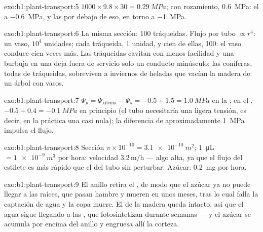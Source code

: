 \begin{solution}{exo:b1:plant-transport:5}
$1000\times 9.8\times 30 = \qty{0.29}{MPa}$; con rozamiento,
\qty{0.6}{MPa}: el  a \qty{-0.6}{MPa}, y las  por debajo de eso,
en torno a \qty{-1}{MPa}.
\end{solution}

\begin{solution}{exo:b1:plant-transport:6}
La misma sección: 100 tráqueidas. Flujo por tubo $\propto r^4$: un vaso,
$10^4$ unidades; cada tráqueida, 1 unidad, y cien de ellas, 100: el vaso
conduce cien veces más. Las tráqueidas cavitan con menos facilidad y una
burbuja en una deja fuera de servicio solo un conducto minúsculo; las
coníferas, todas de tráqueidas, sobreviven a inviernos de heladas que vacían
la madera de un árbol con vasos.
\end{solution}

\begin{solution}{exo:b1:plant-transport:7}
$\Psi_p = \Psi_{\text{xilema}} - \Psi_s = -0.5 + 1.5 = \qty{1.0}{MPa}$ en la
; en el , $-0.5 + 0.4 = \qty{-0.1}{MPa}$ en principio (el tubo
necesitaría una ligera tensión, es decir, en la práctica una  casi
nula); la diferencia de aproximadamente \qty{1}{MPa} impulsa el flujo.
\end{solution}

\begin{solution}{exo:b1:plant-transport:8}
Sección $\pi\times 10^{-10} = \qty{3.1e-10}{m^2}$; \qty{1}{\micro L} $= \qty{1e-9}{m^3}$ por hora: velocidad $3.2\,\mathrm{m/h}$ --- algo alta, ya
que el flujo del estilete es más rápido que el del tubo sin perturbar.
Azúcar: \qty{0.2}{mg} por hora.
\end{solution}

\begin{solution}{exo:b1:plant-transport:9}
El anillo retira el , de modo que el azúcar ya no puede llegar a las
raíces, que pasan hambre y mueren en unos meses, tras lo cual falla la
captación de agua y la copa muere. El  de la madera queda intacto, así
que el agua sigue llegando a las , que fotosintetizan durante semanas
--- y el azúcar se acumula por encima del anillo y engruesa allí la corteza.
\end{solution}

